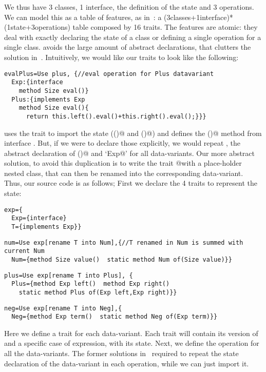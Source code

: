 We thus have 3 classes, 1 interface,
the definition of the state and 3 operations.
We can model this
as a table of features, as in~\cite{deep}:
a (3classes+1interface)*(1state+3operations)
table composed by 16 traits.
The features are atomic: they deal with exactly 
declaring the state of a class
or defining a single operation for a single class.
\name avoids the large amount of abstract declarations,
that clutters the solution in~\cite{deep}.
Intuitively, we would like our traits to look like the following:
\begin{lstlisting}
evalPlus=Use plus, {//eval operation for Plus datavariant
  Exp:{interface
    method Size eval()}
  Plus:{implements Exp
    method Size eval(){
      return this.left().eval()+this.right().eval();}}}
\end{lstlisting}
\Q@evalPlus@ uses the trait \Q@plus@ to import the state (\Q@left()@ and \Q@right()@)
and defines the \Q@eval()@ method from interface \Q@Exp@.
But, if we were to declare those
explicitly, we would repeat \Q@Exp@, the abstract
declaration of \Q@eval()@ and `\Q@implements Exp@'
for all data-variants.
Our more abstract solution, to avoid this duplication is to write 
the trait \Q@eval @with a place-holder \Q@T@ nested class, that can then be renamed
into the corresponding data-variant.
Thus, our source code is as follows;
First we declare the 4 traits to represent the state:
\newcommand\multiCode{\vspace{-5pt}}
\saveSpace
\begin{lstlisting}
exp={
  Exp={interface}
  T={implements Exp}}
\end{lstlisting}
\multiCode
\begin{lstlisting}
num=Use exp[rename T into Num],{//T renamed in Num is summed with current Num
  Num={method Size value()  static method Num of(Size value)}}
\end{lstlisting}
\multiCode
\begin{lstlisting}
plus=Use exp[rename T into Plus], {
  Plus={method Exp left()  method Exp right()
    static method Plus of(Exp left,Exp right)}}
\end{lstlisting}
\multiCode
\begin{lstlisting}
neg=Use exp[rename T into Neg],{
  Neg={method Exp term()  static method Neg of(Exp term)}}
\end{lstlisting}
Here we define a trait for each data-variant.
Each trait will contain its version of \Q@Exp@
and a specific case of expression, with its state.
Next, we define the operation \Q@eval@ for all the data-variants.
The former solutions in~\cite{deep}
required to repeat the state declaration of the 
data-variant in each operation, while we can just import it.

